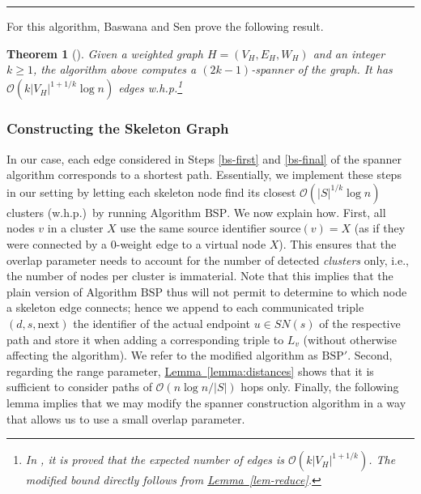 \documentclass[letterpaper,11pt]{article}
\newcommand{\namedref}[2]{\hyperref[#2]{#1~\ref*{#2}}}
\newcommand{\lemmaref}[1]{\namedref{Lemma}{#1}}
\newtheorem{theorem}{Theorem}[section]
\newcommand{\BO}{\mathcal{O}}
\newcommand{\BSP}{\mathrm{BSP}\xspace}
\newcommand{\Next}{\mathrm{next}}
\begin{document}
\hrule\medskip
For this algorithm, Baswana and Sen prove the following result.
\begin{theorem}[\cite{baswana07}]
\label{thm-bs}
Given a weighted graph $H=(V_H,E_H,W_H)$ and an integer $k\ge 1$, the
algorithm above computes a $(2k-1)$-spanner of the graph. It has
$\BO(k|V_H|^{1+1/k}\log n)$ edges w.h.p.\footnote{In \cite{baswana07}, it is proved that the expected number of edges is
$\BO(k|V_H|^{1+1/k})$. The modified bound directly follows from
\lemmaref{lem-reduce}.}
\end{theorem}

\subsubsection*{Constructing the Skeleton Graph}

In our case, each edge considered in Steps \eqref{bs-first} and \eqref{bs-final}
of the spanner algorithm corresponds to a shortest path. Essentially, we
implement these steps in our setting by letting each skeleton node find its
closest $\BO(|S|^{1/k}\log n)$ clusters (w.h.p.)\ by running Algorithm $\BSP$.
We now explain how. First, all nodes $v$ in a cluster $X$ use the same source
identifier $\textrm{source}(v)=X$ (as if they were connected by a $0$-weight
edge to a virtual node $X$). This ensures that the overlap parameter needs to
account for the number of detected \emph{clusters} only, i.e., the number of
nodes per cluster is immaterial. Note that this implies that the plain version
of Algorithm $\BSP$ thus will not permit to determine to which node a skeleton
edge connects; hence we append to each communicated triple $(d,s,\Next)$ the
identifier of the actual endpoint $u\in SN(s)$ of the respective path and store
it when adding a corresponding triple to $L_v$ (without otherwise affecting the
algorithm). We refer to the modified algorithm as $\BSP'$. Second, regarding the
range parameter, \lemmaref{lemma:distances} shows that it is sufficient to
consider paths of $\BO(n\log n/|S|)$ hops only. Finally, the following lemma
implies that we may modify the spanner construction algorithm in a way that
allows us to use a small overlap parameter.
\end{document}
